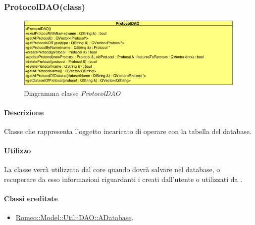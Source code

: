 \color{black}
\pagebreak
\subsubsection{ProtocolDAO(class)}
\label{speprotocoldao}
\begin{figure}[!h]
\centering
			\includegraphics[scale=0.8]{./Content/Immagini/model/ProtocolDAO.png}
			\caption{Diagramma classe \textsl{ProtocolDAO}}
			\label{cl_protocoldao}
\end{figure}

\paragraph{Descrizione \\}
Classe che rappresenta l'oggetto incaricato di operare con la tabella \protocol{} del database.
\paragraph{Utilizzo\\}
La classe verrà utilizzata dal core quando dovrà salvare nel database, o recuperare da esso informazioni riguardanti i \protocol{} creati dall'utente o utilizzati da \project.
\paragraph{Classi ereditate\\}
\begin{itemize}
\item \hyperref[speadatabase]{Romeo::Model::Util::DAO::ADatabase}.
\end{itemize}

